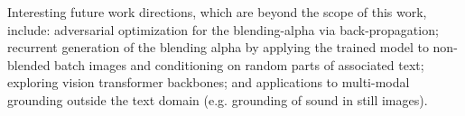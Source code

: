 \documentclass[10pt,twocolumn,letterpaper]{article}
\begin{document}
Interesting future work directions, which are beyond the scope of this work, include: adversarial optimization for the blending-alpha via back-propagation; recurrent generation of the blending alpha by applying the trained model to non-blended batch images and conditioning on random parts of associated text; exploring vision transformer backbones; and applications to multi-modal grounding outside the text domain (e.g. grounding of sound in still images).   \clearpage
{\small


}
\end{document}
